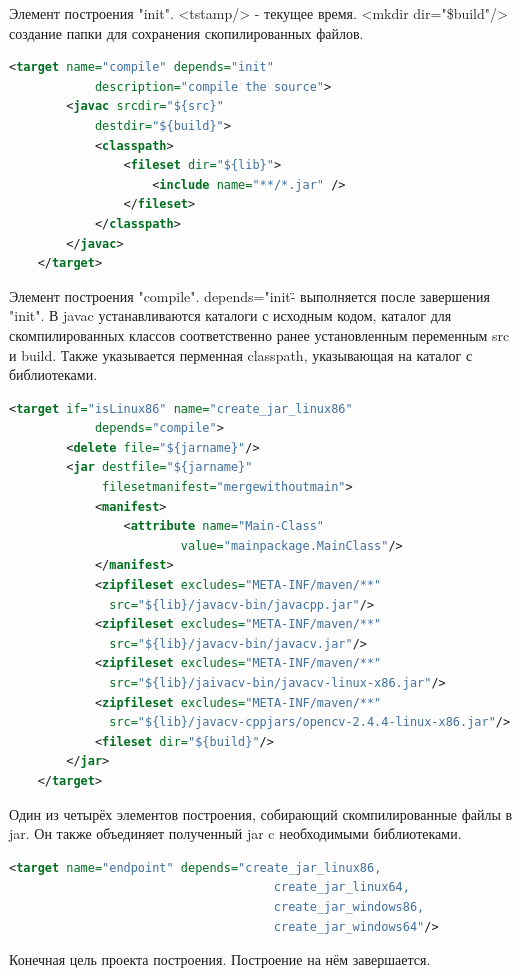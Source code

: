 \documentclass[12pt,a4paper]{extarticle} %
\begin{document}
    Элемент построения "init". <tstamp/> - текущее время. <mkdir dir="\${build}"/> создание папки для сохранения скопилированных файлов.
\begin{lstlisting}[language=xml]
    <target name="compile" depends="init" 
            description="compile the source">
        <javac srcdir="${src}" 
            destdir="${build}">
            <classpath>
                <fileset dir="${lib}">
                    <include name="**/*.jar" />
                </fileset>
            </classpath>
        </javac>
    </target>
\end{lstlisting}

    Элемент построения "compile". depends="init\" - выполняется после завершения "init". В javac устанавливаются каталоги с исходным кодом, каталог для скомпилированных классов соответственно ранее установленным переменным src и build. Также указывается перменная classpath, указывающая на каталог с библиотеками.
\begin{lstlisting}[language=xml]
    <target if="isLinux86" name="create_jar_linux86" 
            depends="compile">
        <delete file="${jarname}"/>
        <jar destfile="${jarname}" 
             filesetmanifest="mergewithoutmain">
            <manifest>
                <attribute name="Main-Class" 
                        value="mainpackage.MainClass"/>
            </manifest>
            <zipfileset excludes="META-INF/maven/**" 
              src="${lib}/javacv-bin/javacpp.jar"/>
            <zipfileset excludes="META-INF/maven/**"
              src="${lib}/javacv-bin/javacv.jar"/>
            <zipfileset excludes="META-INF/maven/**" 
              src="${lib}/jaivacv-bin/javacv-linux-x86.jar"/>
            <zipfileset excludes="META-INF/maven/**" 
              src="${lib}/javacv-cppjars/opencv-2.4.4-linux-x86.jar"/>
            <fileset dir="${build}"/>
        </jar>
    </target>
\end{lstlisting}

    Один из четырёх элементов построения, собирающий скомпилированные файлы в jar. Он также объединяет полученный jar c необходимыми библиотеками.
\begin{lstlisting}[language=xml]
    <target name="endpoint" depends="create_jar_linux86,
                                     create_jar_linux64, 
                                     create_jar_windows86, 
                                     create_jar_windows64"/>
\end{lstlisting}

    Конечная цель проекта построения. Построение на нём завершается.
\end{document}
